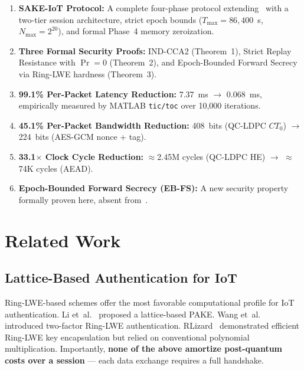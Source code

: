 \documentclass[conference]{IEEEtran}
\newcommand{\Nmax}{N_{\max}}
\newcommand{\Tmax}{T_{\max}}
\begin{document}
\begin{enumerate}
    \item \textbf{SAKE-IoT Protocol:} A complete four-phase protocol
    extending~\cite{kumari2022} with a two-tier session architecture,
    strict epoch bounds ($\Tmax = 86{,}400$~s, $\Nmax = 2^{20}$), and
    formal Phase~4 memory zeroization.

    \item \textbf{Three Formal Security Proofs:} IND-CCA2 (Theorem~1),
    Strict Replay Resistance with $\Pr = 0$ (Theorem~2), and
    Epoch-Bounded Forward Secrecy via Ring-LWE hardness (Theorem~3).

    \item \textbf{99.1\% Per-Packet Latency Reduction:} 7.37~ms
    $\to$ 0.068~ms, empirically measured by MATLAB \texttt{tic/toc}
    over 10,000 iterations.

    \item \textbf{45.1\% Per-Packet Bandwidth Reduction:} 408~bits
    (QC-LDPC $CT_0$) $\to$ 224~bits (AES-GCM nonce + tag).

    \item \textbf{33.1$\times$ Clock Cycle Reduction:} $\approx$2.45M
    cycles (QC-LDPC HE) $\to$ $\approx$74K cycles (AEAD).

    \item \textbf{Epoch-Bounded Forward Secrecy (EB-FS):} A new
    security property formally proven here, absent from~\cite{kumari2022}.
\end{enumerate}

\section{Related Work}
\label{sec:related}

\subsection{Lattice-Based Authentication for IoT}

Ring-LWE-based schemes offer the most favorable computational profile
for IoT authentication. Li et~al.~\cite{li2020} proposed a
lattice-based PAKE. Wang et~al.~\cite{wang2019} introduced two-factor
Ring-LWE authentication. RLizard~\cite{lee2019} demonstrated efficient
Ring-LWE key encapsulation but relied on conventional polynomial
multiplication. Importantly, \textbf{none of the above amortize
post-quantum costs over a session} --- each data exchange requires a
full handshake.
\end{document}
